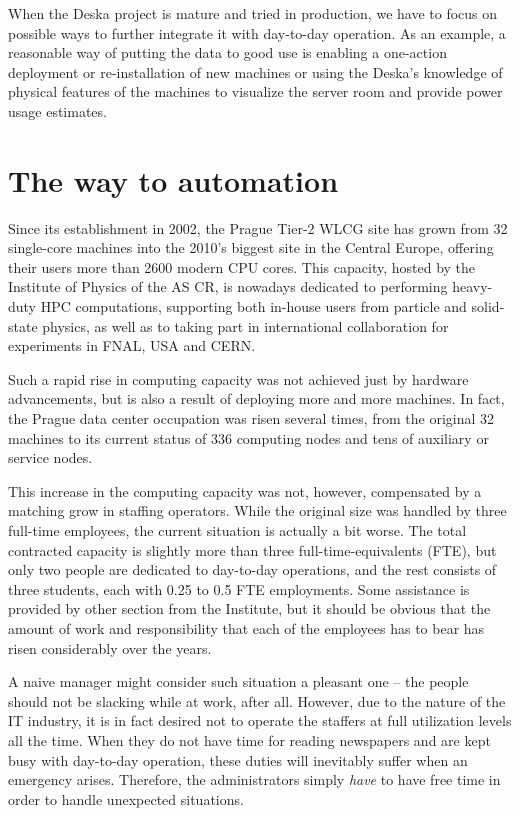 \documentclass[11pt]{article}
\begin{document}
When the Deska project is mature and tried in production, we have to focus on
possible ways to further integrate it with day-to-day operation.  As an example,
a reasonable way of putting the data to good use is enabling a one-action
deployment or re-installation of new machines or using the Deska's knowledge of
physical features of the machines to visualize the server room and provide power
usage estimates.


\section{The way to automation}

Since its establishment in 2002, the Prague Tier-2 WLCG site has grown from 32
single-core machines into the 2010's biggest site in the Central Europe,
offering their users more than 2600 modern CPU cores.  This capacity, hosted by
the Institute of Physics of the AS CR, is nowadays dedicated to performing
heavy-duty HPC computations, supporting both in-house users from particle and
solid-state physics, as well as to taking part in international collaboration
for experiments in FNAL, USA and CERN.

Such a rapid rise in computing capacity was not achieved just by hardware
advancements, but is also a result of deploying more and more machines. In fact,
the Prague data center occupation was risen several times, from the
original 32 machines to its current status of 336 computing nodes and tens of
auxiliary or service nodes.

This increase in the computing capacity was not, however, compensated by a
matching grow in staffing operators.  While the original size was handled by
three full-time employees, the current situation is actually a bit worse.  The
total contracted capacity is slightly more than three full-time-equivalents
(FTE), but only two people are dedicated to day-to-day operations, and the rest
consists of three students, each with 0.25 to 0.5 FTE employments.  Some
assistance is provided by other section from the Institute, but it should be
obvious that the amount of work and responsibility that each of the employees
has to bear has risen considerably over the years.

A naive manager might consider such situation a pleasant one -- the people
should not be slacking while at work, after all.  However, due to the nature of
the IT industry, it is in fact desired not to operate the staffers at full
utilization levels all the time.  When they do not have time for reading
newspapers and are kept busy with day-to-day operation, these duties will
inevitably suffer when an emergency arises.  Therefore, the administrators
simply {\em have} to have free time in order to handle unexpected situations.
\end{document}

